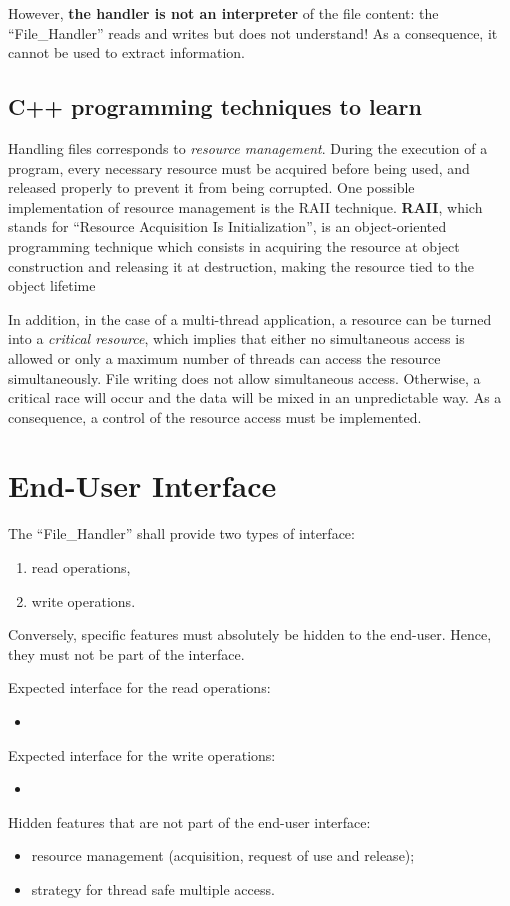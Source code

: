 	 	However, \textbf{the handler is not an interpreter} of the file content: the \enquote{File\_Handler} reads and writes but does not understand!
	 	As a consequence, it cannot be used to extract information.
	 	
	 	
	 \subsection{C++ programming techniques to learn}
	 
	 	Handling files corresponds to \emph{resource management}.
	 	During the execution of a program, every necessary resource must be  acquired before being used, and released properly to prevent it from being corrupted.
	 	One possible implementation of resource management is the RAII technique.
	 	\textbf{RAII}, which stands for \enquote{Resource Acquisition Is Initialization}, is an object-oriented programming technique which consists in acquiring the resource at object construction and releasing it at destruction, making the resource tied to the object lifetime
	 	
	 	In addition, in the case of a multi-thread application, a resource can be turned into a \emph{critical resource}, which implies that either no simultaneous access is allowed or only a maximum number of threads can access the resource simultaneously.
	 	File writing does not allow simultaneous access.
	 	Otherwise, a critical race will occur and the data will be mixed in an unpredictable way.
	 	As a consequence, a control of the resource access must be implemented.
 	
 
 
\section{End-User Interface}

	The \enquote{File\_Handler} shall provide two types of interface:
	\begin{enumerate}
		\item read operations,
		\item write operations.
	\end{enumerate}
	Conversely, specific features must absolutely be hidden to the end-user.
	Hence, they must not be part of the interface.
	
	Expected interface for the read operations:
	\begin{itemize}
		\item 
	\end{itemize}

	Expected interface for the write operations:
	\begin{itemize}
		\item 
	\end{itemize}

	Hidden features that are not part of the end-user interface:
	\begin{itemize}
		\item resource management (acquisition, request of use and release);
		\item strategy for thread safe multiple access.
	\end{itemize}
	